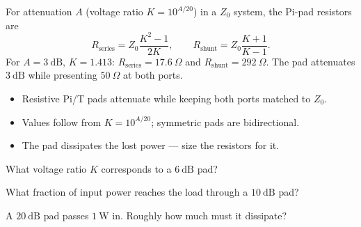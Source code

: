 \begin{workedexample}
For attenuation $A$ (voltage ratio $K = 10^{A/20}$) in a $Z_0$ system, the
Pi-pad resistors are
\[ R_{\text{series}} = Z_0\frac{K^2-1}{2K}, \qquad
   R_{\text{shunt}} = Z_0\frac{K+1}{K-1}. \]
For $A = 3\ \text{dB}$, $K = 1.413$: $R_{\text{series}} = 17.6\ \Omega$ and
$R_{\text{shunt}} = 292\ \Omega$. The pad attenuates $3\ \text{dB}$ while
presenting $50\ \Omega$ at both ports.
\end{workedexample}

\begin{keytakeaways}
\begin{itemize}[leftmargin=1.4em,itemsep=2pt]
\item Resistive Pi/T pads attenuate while keeping both ports matched to $Z_0$.
\item Values follow from $K = 10^{A/20}$; symmetric pads are bidirectional.
\item The pad dissipates the lost power --- size the resistors for it.
\end{itemize}
\end{keytakeaways}

\begin{exercises}
\item What voltage ratio $K$ corresponds to a $6\ \text{dB}$ pad?
\item What fraction of input power reaches the load through a $10\ \text{dB}$ pad?
\item A $20\ \text{dB}$ pad passes $1\ \text{W}$ in. Roughly how much must it dissipate?
\end{exercises}

